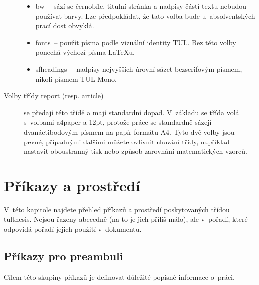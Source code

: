 \documentclass[FM,DP,fonts]{tulthesis}
\newcommand{\argument}[1]{{\ttfamily\color{\tulcolor}#1}}
\newcommand{\argumentindex}[1]{\argument{#1}\index{#1}}
\begin{document}
\begin{description}
\begin{itemize}
\item \argumentindex{bw}~-- sází se černobíle, titulní stránka a nadpisy částí
textu nebudou používat barvy. Lze předpokládat, že tato volba bude
u~absolventských prací dost obvyklá.

\item \argumentindex{fonts}~-- použít písma podle vizuální identity TUL. Bez
této volby ponechá výchozí písma \LaTeX u.

\item \argumentindex{sfheadings}~-- nadpisy nejvyšších úrovní sázet
bezserifovým písmem, nikoli písmem TUL Mono.

\end{itemize}

\item[Volby třídy \argument{report} (resp. \argument{article})] se předají této
třídě a mají standardní dopad. V~základu se třída volá s~volbami
\argument{a4paper} a \argument{12pt}, protože práce se standardně sázejí
dvanáctibodovým písmem na papír formátu A4. Tyto dvě volby jsou pevné,
případnými dalšími můžete ovlivnit chování třídy, například nastavit
oboustranný tisk nebo způsob zarovnání matematických vzorců.

\end{description}


\chapter{Příkazy a prostředí}

V~této kapitole najdete přehled příkazů a prostředí poskytovaných třídou
\argument{tulthesis}. Nejsou řazeny abecedně (na to je jich příliš málo), ale
v~pořadí, které odpovídá pořadí jejich použití v~dokumentu.


\section{Příkazy pro preambuli}\label{deklarace}

Cílem této skupiny příkazů je definovat důležité popisné informace o~práci.
\end{document}
